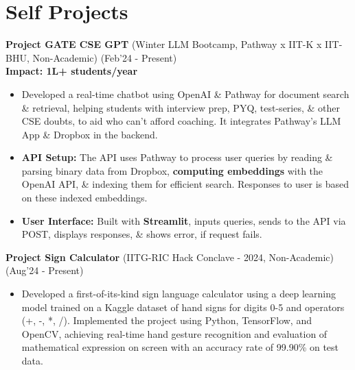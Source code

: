 \documentclass[10.8pt, a4paper]{extarticle}
\newcommand{\shorterSection}[1]{\vspace{-10pt}\section{#1}}
\begin{document}
\vspace{2pt}



\vspace{4pt}
\shorterSection{Self Projects}
\textbf{Project GATE CSE GPT} (Winter LLM Bootcamp, Pathway x IIT-K x IIT-BHU, Non-Academic) \href{https://github.com/souvikcseiitk/gate_cse_gpt}{\faGithub{}} \hfill(Feb'24 - Present) \\
         \textbf{Impact: 1L+ students/year} \\
         
	\begin{itemize}
 
        \item Developed a real-time chatbot using OpenAI \& Pathway for document search \& retrieval, helping students with interview prep, PYQ, test-series, \& other CSE doubts, to aid who can't afford coaching. It integrates Pathway’s LLM App \& Dropbox in the backend.

        \item \textbf{API Setup: }The API uses Pathway to process user queries by reading \& parsing binary data from Dropbox, \textbf{computing embeddings} with the OpenAI API, \& indexing them for efficient search. Responses to user is based on these indexed embeddings.

        \item \textbf{User Interface: }Built with \textbf{Streamlit}, inputs queries, sends to the API via POST, displays responses, \& shows error, if request fails.
	\end{itemize}

\vspace{0.5mm}

\textbf{Project Sign Calculator} (IITG-RIC Hack Conclave - 2024, Non-Academic) \href{https://github.com/souvikcseiitk/sign-calculator}{\faGithub{}} \href{https://nbviewer.org/github/souvikcseiitk/sign-calculator/blob/main/0_main.ipynb}{\faLink{}} \hfill(Aug'24 - Present) \\
         
	\begin{itemize}
 
        \item Developed a first-of-its-kind sign language calculator using a deep learning model trained on a Kaggle dataset of hand signs for digits 0-5 and operators (+, -, *, /). Implemented the project using Python, TensorFlow, and OpenCV, achieving real-time hand gesture recognition and evaluation of mathematical expression on screen with an accuracy rate of 99.90\% on test data.
        \end{itemize}
\end{document}
